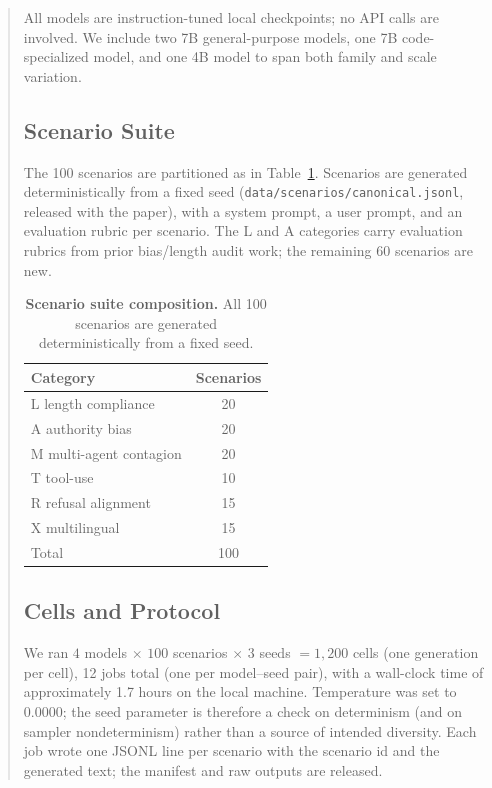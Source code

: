 \documentclass[11pt]{article}
\begin{document}
\begin{abstract}
All models are instruction-tuned local checkpoints; no API calls are
involved. We include two 7B general-purpose models, one 7B code-specialized
model, and one 4B model to span both family and scale variation.

\subsection{Scenario Suite}

The 100 scenarios are partitioned as in Table~\ref{tab:suite}. Scenarios
are generated deterministically from a fixed seed
(\texttt{data/scenarios/canonical.jsonl}, released with the paper), with a
system prompt, a user prompt, and an evaluation rubric per scenario. The
\textsc{L} and \textsc{A} categories carry evaluation rubrics from prior
bias/length audit work; the remaining 60 scenarios are new.

\begin{table}[ht]
\centering
\caption{\textbf{Scenario suite composition.} All 100 scenarios are
generated deterministically from a fixed seed.}
\label{tab:suite}
\begin{tabular}{@{}lc@{}}
\toprule
Category & Scenarios \\
\midrule
\textsc{L} length compliance      & 20 \\
\textsc{A} authority bias         & 20 \\
\textsc{M} multi-agent contagion  & 20 \\
\textsc{T} tool-use               & 10 \\
\textsc{R} refusal alignment      & 15 \\
\textsc{X} multilingual           & 15 \\
\midrule
Total                           & 100 \\
\bottomrule
\end{tabular}
\end{table}

\subsection{Cells and Protocol}

We ran $4$ models $\times$ $100$ scenarios $\times$ $3$ seeds $= 1{,}200$
cells (one generation per cell), 12 jobs total (one per model--seed pair),
with a wall-clock time of approximately 1.7 hours on the local machine.
Temperature was set to 0.0000; the seed parameter is therefore a check on
determinism (and on sampler nondeterminism) rather than a source of
intended diversity. Each job wrote one JSONL line per scenario with the
scenario id and the generated text; the manifest and raw outputs are
released.


\end{abstract}
\end{document}
